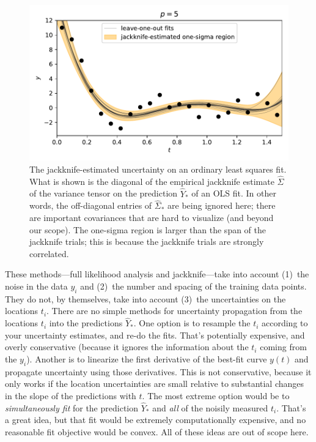 \documentclass[12pt,letterpaper]{article}
\newlength{\figurewidth}
\begin{document}
\begin{figure}[t]
    \begin{mdframed}
    \includegraphics[width=\figurewidth]{paper/uncertainty.pdf}
    \caption{The jackknife-estimated uncertainty on an ordinary least squares fit. What is shown is the diagonal of the empirical jackknife estimate $\hat{\Sigma}$ of the variance tensor on the prediction $\hat{Y}_\ast$ of an OLS fit. In other words, the off-diagonal entries of $\hat{\Sigma}_\ast$ are being ignored here; there are important covariances that are hard to visualize (and beyond our scope). The one-sigma region is larger than the span of the jackknife trials; this is because the jackknife trials are strongly correlated.}
    \label{fig:uncertainty}
    \end{mdframed}
\end{figure}

These methods---full likelihood analysis and jackknife---take into account (1)~the noise in the data $y_i$ and (2)~the number and spacing of the training data points.
They do not, by themselves, take into account (3)~the uncertainties on the locations $t_i$.
There are no simple methods for uncertainty propagation from the locations $t_i$ into the predictions $\hat{Y}_\ast$.
One option is to resample the $t_i$ according to your uncertainty estimates, and re-do the fits.
That's potentially expensive, and overly conservative (because it ignores the information about the $t_i$ coming from the $y_i$).
Another is to linearize the first derivative of the best-fit curve $y(t)$ and propagate uncertainty using those derivatives.
This is not conservative, because it only works if the location uncertainties are small relative to substantial changes in the slope of the predictions with $t$.
The most extreme option would be to \emph{simultaneously fit} for the prediction $\hat{Y}_\ast$ and \emph{all} of the noisily measured $t_i$.
That's a great idea, but that fit would be extremely computationally expensive, and no reasonable fit objective would be convex.
All of these ideas are out of scope here.
\end{document}
